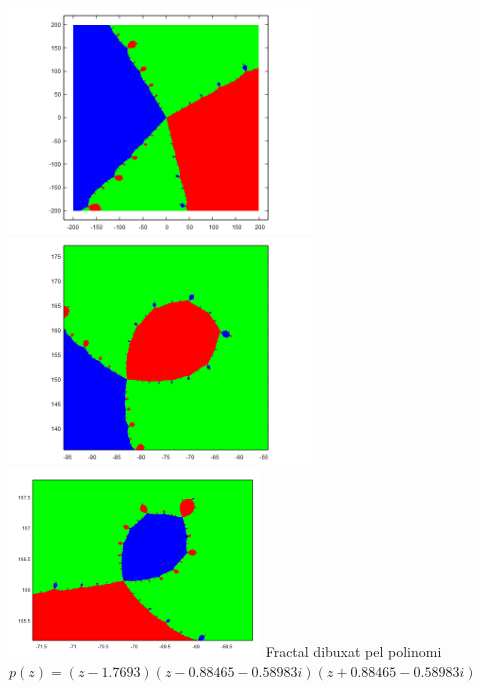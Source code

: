 \documentclass[12pt]{report}
\begin{document}
\newpage
\begin{center}
    \includegraphics[width=0.6\textwidth]{mandel.png}
    \newline
    \includegraphics[width=0.6\textwidth]{mandel_zoom.png}
    \newline
    \includegraphics[width=0.5\textwidth]{mandel_zoom2.png}
    \newline
\hspace{-6em}Fractal dibuxat pel polinomi $p(z)=(z-1.7693)(z-0.88465-0.58983i) (z+0.88465-0.58983i) $
\label{fig:prodcte arrels}
\end{center}
\newpage
\end{document}
